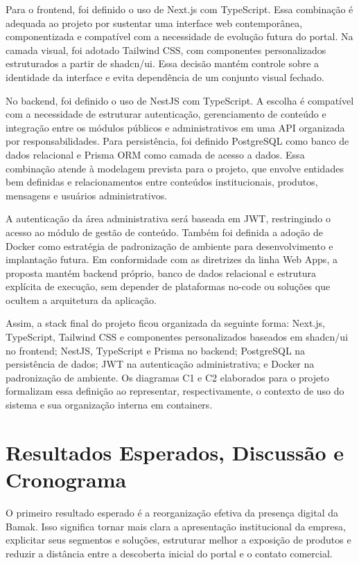 \documentclass[portuguese]{sbcreviews-2025}
\begin{document}
Para o frontend, foi definido o uso de Next.js com TypeScript. Essa combinação é adequada ao projeto por sustentar uma interface web contemporânea, componentizada e compatível com a necessidade de evolução futura do portal. Na camada visual, foi adotado Tailwind CSS, com componentes personalizados estruturados a partir de shadcn/ui. Essa decisão mantém controle sobre a identidade da interface e evita dependência de um conjunto visual fechado.

No backend, foi definido o uso de NestJS com TypeScript. A escolha é compatível com a necessidade de estruturar autenticação, gerenciamento de conteúdo e integração entre os módulos públicos e administrativos em uma API organizada por responsabilidades. Para persistência, foi definido PostgreSQL como banco de dados relacional e Prisma ORM como camada de acesso a dados. Essa combinação atende à modelagem prevista para o projeto, que envolve entidades bem definidas e relacionamentos entre conteúdos institucionais, produtos, mensagens e usuários administrativos.

A autenticação da área administrativa será baseada em JWT, restringindo o acesso ao módulo de gestão de conteúdo. Também foi definida a adoção de Docker como estratégia de padronização de ambiente para desenvolvimento e implantação futura. Em conformidade com as diretrizes da linha Web Apps, a proposta mantém backend próprio, banco de dados relacional e estrutura explícita de execução, sem depender de plataformas no-code ou soluções que ocultem a arquitetura da aplicação.

Assim, a stack final do projeto ficou organizada da seguinte forma: Next.js, TypeScript, Tailwind CSS e componentes personalizados baseados em shadcn/ui no frontend; NestJS, TypeScript e Prisma no backend; PostgreSQL na persistência de dados; JWT na autenticação administrativa; e Docker na padronização de ambiente. Os diagramas C1 e C2 elaborados para o projeto formalizam essa definição ao representar, respectivamente, o contexto de uso do sistema e sua organização interna em containers.

\section{Resultados Esperados, Discussão e Cronograma}

O primeiro resultado esperado é a reorganização efetiva da presença digital da Bamak. Isso significa tornar mais clara a apresentação institucional da empresa, explicitar seus segmentos e soluções, estruturar melhor a exposição de produtos e reduzir a distância entre a descoberta inicial do portal e o contato comercial.
\end{document}
